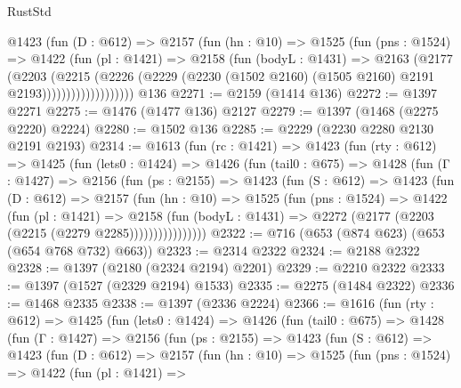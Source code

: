 \begin{lexlean}{RustStd}
\begin{coremodule}
                  @1423
                    (fun (D : @612) =>
                    @2157
                      (fun (hn : @10) =>
                      @1525
                        (fun (pns : @1524) =>
                        @1422
                          (fun (pl : @1421) =>
                          @2158
                            (fun (bodyL : @1431) =>
                            @2163
                              (@2177
                                (@2203
                                  (@2215
                                    (@2226
                                      (@2229
                                        (@2230
                                          (@1502 @2160)
                                          (@1505 @2160)
                                          @2191
                                          @2193)))))))))))))))))))
    @136
@2271 := @2159 (@1414 @136)
@2272 := @1397 @2271
@2275 := @1476 (@1477 @136) @2127
@2279 := @1397 (@1468 (@2275 @2220) @2224)
@2280 := @1502 @136
@2285 := @2229 (@2230 @2280 @2130 @2191 @2193)
@2314 := @1613
    (fun (rc : @1421) =>
    @1423
      (fun (rty : @612) =>
      @1425
        (fun (lets0 : @1424) =>
        @1426
          (fun (tail0 : @675) =>
          @1428
            (fun (Γ : @1427) =>
            @2156
              (fun (ps : @2155) =>
              @1423
                (fun (S : @612) =>
                @1423
                  (fun (D : @612) =>
                  @2157
                    (fun (hn : @10) =>
                    @1525
                      (fun (pns : @1524) =>
                      @1422
                        (fun (pl : @1421) =>
                        @2158
                          (fun (bodyL : @1431) =>
                          @2272 (@2177 (@2203 (@2215 (@2279 @2285))))))))))))))))
@2322 := @716 (@653 (@874 @623) (@653 (@654 @768 @732) @663))
@2323 := @2314 @2322
@2324 := @2188 @2322
@2328 := @1397 (@2180 (@2324 @2194) @2201)
@2329 := @2210 @2322
@2333 := @1397 (@1527 (@2329 @2194) @1533)
@2335 := @2275 (@1484 @2322)
@2336 := @1468 @2335
@2338 := @1397 (@2336 @2224)
@2366 := @1616
    (fun (rty : @612) =>
    @1425
      (fun (lets0 : @1424) =>
      @1426
        (fun (tail0 : @675) =>
        @1428
          (fun (Γ : @1427) =>
          @2156
            (fun (ps : @2155) =>
            @1423
              (fun (S : @612) =>
              @1423
                (fun (D : @612) =>
                @2157
                  (fun (hn : @10) =>
                  @1525
                    (fun (pns : @1524) =>
                    @1422
                      (fun (pl : @1421) =>

\end{coremodule}
\end{lexlean}
